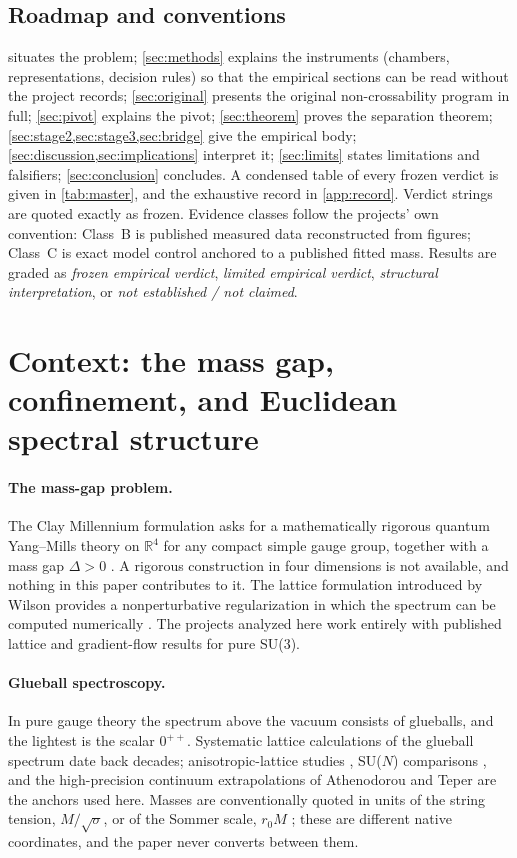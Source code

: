 \documentclass[11pt,a4paper]{article}
\theoremstyle{definition}
\theoremstyle{remark}
\newcommand{\sqs}{\sqrt{\sigma}}
\begin{document}
\subsection{Roadmap and conventions}
 situates the problem; \cref{sec:methods} explains the instruments (chambers, representations, decision rules) so that the empirical sections can be read without the project records; \cref{sec:original} presents the original non-crossability program in full; \cref{sec:pivot} explains the pivot; \cref{sec:theorem} proves the separation theorem; \cref{sec:stage2,sec:stage3,sec:bridge} give the empirical body; \cref{sec:discussion,sec:implications} interpret it; \cref{sec:limits} states limitations and falsifiers; \cref{sec:conclusion} concludes. A condensed table of every frozen verdict is given in \cref{tab:master}, and the exhaustive record in \cref{app:record}. Verdict strings are quoted exactly as frozen. Evidence classes follow the projects' own convention: Class~B is published measured data reconstructed from figures; Class~C is exact model control anchored to a published fitted mass. Results are graded as \emph{frozen empirical verdict}, \emph{limited empirical verdict}, \emph{structural interpretation}, or \emph{not established / not claimed}.

\section{Context: the mass gap, confinement, and Euclidean spectral structure}\label{sec:related}

\paragraph{The mass-gap problem.} The Clay Millennium formulation asks for a mathematically rigorous quantum Yang--Mills theory on $\mathbb R^4$ for any compact simple gauge group, together with a mass gap $\Delta>0$ \cite{JaffeWitten}. A rigorous construction in four dimensions is not available, and nothing in this paper contributes to it. The lattice formulation introduced by Wilson \cite{Wilson74} provides a nonperturbative regularization in which the spectrum can be computed numerically \cite{Creutz80,GattringerLang}. The projects analyzed here work entirely with published lattice and gradient-flow results for pure SU(3).

\paragraph{Glueball spectroscopy.} In pure gauge theory the spectrum above the vacuum consists of glueballs, and the lightest is the scalar $0^{++}$. Systematic lattice calculations of the glueball spectrum date back decades; anisotropic-lattice studies \cite{MorningstarPeardon99,Chen06}, SU($N$) comparisons \cite{LuciniTeperWenger04,Teper98}, and the high-precision continuum extrapolations of Athenodorou and Teper \cite{AT20} are the anchors used here. Masses are conventionally quoted in units of the string tension, $M/\sqs$, or of the Sommer scale, $r_0M$ \cite{Sommer94}; these are different native coordinates, and the paper never converts between them.
\end{document}
